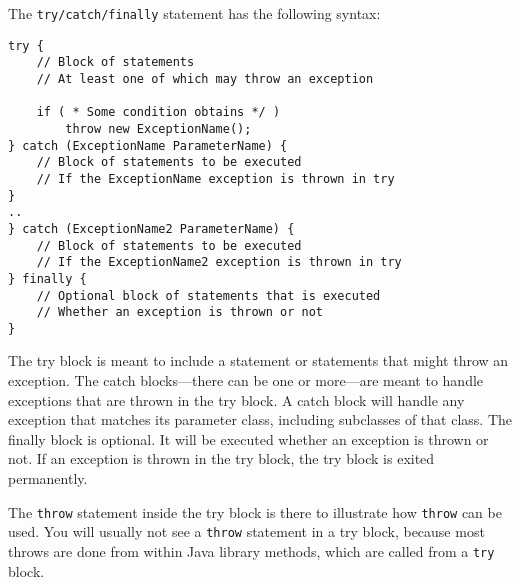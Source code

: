 \label{the-try-catch-statement}

\noindent The {\tt try/catch/finally} statement has the following syntax:

\begin{jjjlisting}
\begin{lstlisting}
try {
    // Block of statements
    // At least one of which may throw an exception

    if ( * Some condition obtains */ )
        throw new ExceptionName();
} catch (ExceptionName ParameterName) {
    // Block of statements to be executed
    // If the ExceptionName exception is thrown in try
}
..
} catch (ExceptionName2 ParameterName) {
    // Block of statements to be executed
    // If the ExceptionName2 exception is thrown in try
} finally {
    // Optional block of statements that is executed
    // Whether an exception is thrown or not
}
\end{lstlisting}
\end{jjjlisting}

\noindent The try block is meant to include a statement or
statements that might throw an exception.  The catch blocks---there
can be one or more---are meant to handle exceptions that are thrown
in the try block.  A catch block will handle any exception that
matches its parameter class, including subclasses of that class.
The finally block is optional.  It will be executed whether
an exception is thrown or not.  If an exception is thrown in
the try block, the try block is exited permanently.

The {\tt throw} statement inside the try block is there
to illustrate how {\tt throw} can be used.  You will
usually not see a {\tt throw} statement in a try block,
because most throws are done from within Java library methods,
which are called from a {\tt try} block.

\label{summaryof-important-points}

